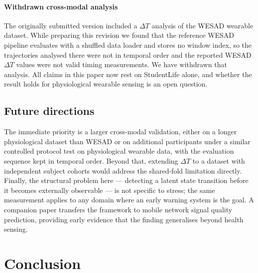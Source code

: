\documentclass[preprint,12pt,authoryear]{elsarticle}
\newcommand{\dt}{$\Delta T$}
\providecommand{\DIFaddtex}[1]{{\protect\color{blue} \sf #1}} %
\providecommand{\DIFdeltex}[1]{{\protect\color{red} \scriptsize #1}} %
\providecommand{\DIFaddbegin}{} %
\providecommand{\DIFaddend}{} %
\providecommand{\DIFdelbegin}{} %
\providecommand{\DIFdelend}{} %
\providecommand{\DIFadd}[1]{\texorpdfstring{\DIFaddtex{#1}}{#1}} %
\providecommand{\DIFdel}[1]{\texorpdfstring{\DIFdeltex{#1}}{}} %
\newcommand{\DIFscaledelfig}{0.5}
\newlength{\DIFdelgraphicswidth} %
\newlength{\DIFdelgraphicsheight} %
\newcommand{\DIFaddincludegraphics}[2][]{{\color{blue}\fbox{\DIFOincludegraphics[#1]{#2}}}} %
\newcommand{\DIFdelincludegraphics}[2][]{%
\sbox{\DIFdelgraphicsbox}{\DIFOincludegraphics[#1]{#2}}%
\settoboxwidth{\DIFdelgraphicswidth}{\DIFdelgraphicsbox} %
\settoboxtotalheight{\DIFdelgraphicsheight}{\DIFdelgraphicsbox} %
\scalebox{\DIFscaledelfig}{%
\parbox[b]{\DIFdelgraphicswidth}{\usebox{\DIFdelgraphicsbox}\\[-\baselineskip] \rule{\DIFdelgraphicswidth}{0em}}\llap{\resizebox{\DIFdelgraphicswidth}{\DIFdelgraphicsheight}{%
\setlength{\unitlength}{\DIFdelgraphicswidth}%
\begin{picture}(1,1)%
\thicklines\linethickness{2pt} %
{\color[rgb]{1,0,0}\put(0,0){\framebox(1,1){}}}%
{\color[rgb]{1,0,0}\put(0,0){\line( 1,1){1}}}%
{\color[rgb]{1,0,0}\put(0,1){\line(1,-1){1}}}%
\end{picture}%
}\hspace*{3pt}}} %
} %
\DeclareRobustCommand{\DIFaddbegin}{\DIFOaddbegin \let\includegraphics\DIFaddincludegraphics} %
\DeclareRobustCommand{\DIFaddend}{\DIFOaddend \let\includegraphics\DIFOincludegraphics} %
\DeclareRobustCommand{\DIFdelbegin}{\DIFOdelbegin \let\includegraphics\DIFdelincludegraphics} %
\DeclareRobustCommand{\DIFdelend}{\DIFOaddend \let\includegraphics\DIFOincludegraphics} %
\begin{document}
\paragraph{Withdrawn cross-modal analysis} \DIFadd{The originally submitted
version included a \dt{} analysis of the WESAD wearable dataset. While
preparing this revision we found that the reference WESAD pipeline
evaluates with a shuffled data loader and stores no window index, so
the trajectories analysed there were not in temporal order and the
reported WESAD \dt{} values were not valid timing measurements. We have
withdrawn that analysis. All claims in this paper now rest on
StudentLife alone, and whether the result holds for physiological
wearable sensing is an open question}\DIFaddend .

\subsection{Future directions}

The immediate priority is a \DIFdelbegin \DIFdel{larger }\DIFdelend cross-modal \DIFdelbegin \DIFdel{validation, either on a
longer physiological
dataset than WESAD or on additional participants
under a similar controlled protocol}\DIFdelend \DIFaddbegin \DIFadd{test on physiological
wearable data, with the evaluation sequence kept in temporal order}\DIFaddend .
Beyond that, extending \dt{} to
a dataset with independent subject cohorts would address the shared-fold
limitation directly. Finally, the structural problem here --- detecting
a latent state transition before it becomes externally observable ---
is not specific to stress; the same measurement applies to any domain
where an early warning system is the goal. A companion paper transfers
the framework to mobile network signal quality prediction, providing
early evidence that the finding generalises beyond health sensing.

\section{Conclusion}
\end{document}
